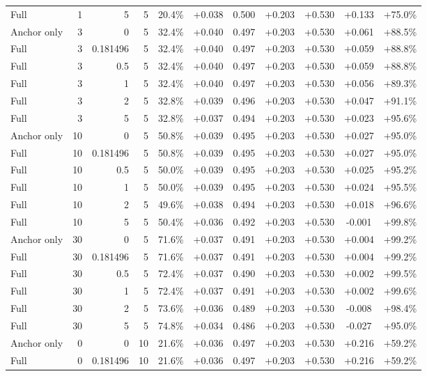 \begin{table}[htbp]
\begin{tabular}{lrrrccccccc}
Full & 1 & 5 & 5 & 20.4\% & +0.038 & 0.500 & +0.203 & +0.530 & +0.133 & +75.0\% \\
Anchor only & 3 & 0 & 5 & 32.4\% & +0.040 & 0.497 & +0.203 & +0.530 & +0.061 & +88.5\% \\
Full & 3 & 0.181496 & 5 & 32.4\% & +0.040 & 0.497 & +0.203 & +0.530 & +0.059 & +88.8\% \\
Full & 3 & 0.5 & 5 & 32.4\% & +0.040 & 0.497 & +0.203 & +0.530 & +0.059 & +88.8\% \\
Full & 3 & 1 & 5 & 32.4\% & +0.040 & 0.497 & +0.203 & +0.530 & +0.056 & +89.3\% \\
Full & 3 & 2 & 5 & 32.8\% & +0.039 & 0.496 & +0.203 & +0.530 & +0.047 & +91.1\% \\
Full & 3 & 5 & 5 & 32.8\% & +0.037 & 0.494 & +0.203 & +0.530 & +0.023 & +95.6\% \\
Anchor only & 10 & 0 & 5 & 50.8\% & +0.039 & 0.495 & +0.203 & +0.530 & +0.027 & +95.0\% \\
Full & 10 & 0.181496 & 5 & 50.8\% & +0.039 & 0.495 & +0.203 & +0.530 & +0.027 & +95.0\% \\
Full & 10 & 0.5 & 5 & 50.0\% & +0.039 & 0.495 & +0.203 & +0.530 & +0.025 & +95.2\% \\
Full & 10 & 1 & 5 & 50.0\% & +0.039 & 0.495 & +0.203 & +0.530 & +0.024 & +95.5\% \\
Full & 10 & 2 & 5 & 49.6\% & +0.038 & 0.494 & +0.203 & +0.530 & +0.018 & +96.6\% \\
Full & 10 & 5 & 5 & 50.4\% & +0.036 & 0.492 & +0.203 & +0.530 & -0.001 & +99.8\% \\
Anchor only & 30 & 0 & 5 & 71.6\% & +0.037 & 0.491 & +0.203 & +0.530 & +0.004 & +99.2\% \\
Full & 30 & 0.181496 & 5 & 71.6\% & +0.037 & 0.491 & +0.203 & +0.530 & +0.004 & +99.2\% \\
Full & 30 & 0.5 & 5 & 72.4\% & +0.037 & 0.490 & +0.203 & +0.530 & +0.002 & +99.5\% \\
Full & 30 & 1 & 5 & 72.4\% & +0.037 & 0.491 & +0.203 & +0.530 & +0.002 & +99.6\% \\
Full & 30 & 2 & 5 & 73.6\% & +0.036 & 0.489 & +0.203 & +0.530 & -0.008 & +98.4\% \\
Full & 30 & 5 & 5 & 74.8\% & +0.034 & 0.486 & +0.203 & +0.530 & -0.027 & +95.0\% \\
Anchor only & 0 & 0 & 10 & 21.6\% & +0.036 & 0.497 & +0.203 & +0.530 & +0.216 & +59.2\% \\
Full & 0 & 0.181496 & 10 & 21.6\% & +0.036 & 0.497 & +0.203 & +0.530 & +0.216 & +59.2\% \\

\end{tabular}
\end{table}
